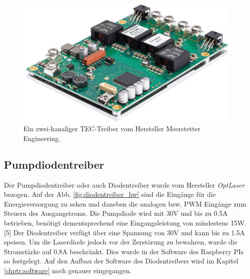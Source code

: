 \begin{figure}[H]
    \centering
    \includegraphics[scale=0.2]{98_images/tec_controller_real_isometry_meerstetter.PNG}
    \caption{Ein zwei-kanaliger TEC-Treiber vom Hersteller Meerstetter Engineering.}
    \label{fig:tec_treiber_hw}
\end{figure}

\subsection{Pumpdiodentreiber}
\label{chptr:_diodentreiber}
Der Pumpdiodentreiber oder auch Diodentreiber wurde vom Hersteller \textit{OptLaser} bezogen. Auf der Abb. \ref{fig:diodentreiber_hw} sind die Eingänge für die Energieversorgung zu sehen und daneben die analogen bzw. PWM Eingänge zum Steuern des Ausgangstroms. Die Pumpdiode wird mit 30V und bis zu 0.5A betrieben, benötigt dementsprechend eine Eingangsleistung von mindestens 15W. [5] Der Diodentreiber verfügt über eine Spannung von 30V und kann bis zu 1.5A speisen. Um die Laserdiode jedoch vor der Zerstörung zu bewahren, wurde die Stromstärke auf 0.8A beschränkt. Dies wurde in der Software des Raspberry PIs so festgelegt. Auf den Aufbau der Software des Diodentreibers wird im Kapitel \ref{chptr:software} noch genauer eingegangen.

